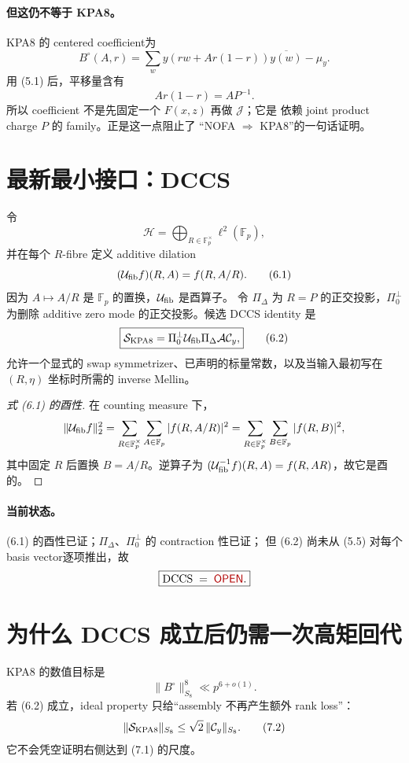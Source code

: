 \documentclass[11pt,a4paper]{ctexart}
\theoremstyle{definition}
\newcommand{\F}{\mathbb F}
\newcommand{\G}{\F_p^\times}
\newcommand{\1}{\mathbf 1}
\newcommand{\OPEN}{\textcolor{red!70!black}{\textsf{OPEN}}}
\begin{document}
\paragraph{但这仍不等于 KPA8。}
KPA8 的 centered coefficient为
\[
B^\circ(A,r)
=\sum_w y(rw+Ar(1-r))\overline{y(w)}-\mu_y.
\tag{5.5}
\]
用 (5.1) 后，平移量含有
\[
Ar(1-r)=AP^{-1}.
\tag{5.6}
\]
所以 coefficient 不是先固定一个 $F(x,z)$ 再做 $\mathcal J$；它是
依赖 joint product charge $P$ 的 family。正是这一点阻止了
“NOFA $\Rightarrow$ KPA8”的一句话证明。

\section{最新最小接口：DCCS}

令
\[
\mathscr H=\bigoplus_{R\in\G}\ell^2(\F_p),
\]
并在每个 $R$-fibre 定义 additive dilation
\[
(\mathcal U_{\rm fib}f)(R,A)=f(R,A/R).
\tag{6.1}
\]
因为 $A\mapsto A/R$ 是 $\F_p$ 的置换，$\mathcal U_{\rm fib}$ 是酉算子。
令 $\Pi_\Delta$ 为 $R=P$ 的正交投影，$\Pi_0^\perp$ 为删除 additive
zero mode 的正交投影。候选 DCCS identity 是
\[
\boxed{
\mathcal S_{\rm KPA8}
=\Pi_0^\perp\mathcal U_{\rm fib}\Pi_\Delta
\mathcal A\mathcal C_y,}
\tag{6.2}
\]
允许一个显式的 swap symmetrizer、已声明的标量常数，以及当输入最初写在
$(R,\eta)$ 坐标时所需的 inverse Mellin。

\begin{proof}[式 \textup{(6.1)} 的酉性]
在 counting measure 下，
\[
\|\mathcal U_{\rm fib}f\|_2^2
=\sum_{R\in\G}\sum_{A\in\F_p}|f(R,A/R)|^2
=\sum_{R\in\G}\sum_{B\in\F_p}|f(R,B)|^2,
\]
其中固定 $R$ 后置换 $B=A/R$。逆算子为
$(\mathcal U_{\rm fib}^{-1}f)(R,A)=f(R,AR)$，故它是酉的。
\end{proof}

\paragraph{当前状态。}
(6.1) 的酉性已证；$\Pi_\Delta$、$\Pi_0^\perp$ 的 contraction 性已证；
但 (6.2) 尚未从 (5.5) 对每个 basis vector逐项推出，故
\[
\boxed{\mathrm{DCCS}\;=\;\OPEN.}
\]

\section{为什么 DCCS 成立后仍需一次高矩回代}

KPA8 的数值目标是
\[
\boxed{\|B^\circ\|_{S_8}^8\ll p^{6+o(1)}.}
\tag{7.1}
\]
若 (6.2) 成立，ideal property 只给“assembly 不再产生额外 rank loss”：
\[
\|\mathcal S_{\rm KPA8}\|_{S_8}
\le \sqrt2\,\|\mathcal C_y\|_{S_8}.
\tag{7.2}
\]
它不会凭空证明右侧达到 (7.1) 的尺度。
\end{document}
